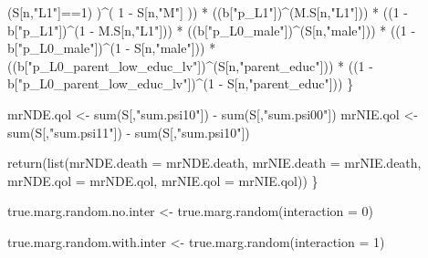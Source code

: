 \documentclass[
]{book}
\newenvironment{Shaded}{\begin{snugshade}}{\end{snugshade}}
\newcommand{\AttributeTok}[1]{\textcolor[rgb]{0.77,0.63,0.00}{#1}}
\newcommand{\DecValTok}[1]{\textcolor[rgb]{0.00,0.00,0.81}{#1}}
\newcommand{\FunctionTok}[1]{\textcolor[rgb]{0.00,0.00,0.00}{#1}}
\newcommand{\NormalTok}[1]{#1}
\newcommand{\OtherTok}[1]{\textcolor[rgb]{0.56,0.35,0.01}{#1}}
\newcommand{\SpecialCharTok}[1]{\textcolor[rgb]{0.00,0.00,0.00}{#1}}
\newcommand{\StringTok}[1]{\textcolor[rgb]{0.31,0.60,0.02}{#1}}
\begin{document}
\begin{Shaded}
\begin{Highlighting}[]
\NormalTok{          (S[n,}\StringTok{"L1"}\NormalTok{]}\SpecialCharTok{==}\DecValTok{1}\NormalTok{) )}\SpecialCharTok{\^{}}\NormalTok{( }\DecValTok{1} \SpecialCharTok{{-}}\NormalTok{ S[n,}\StringTok{"M"}\NormalTok{] )) }\SpecialCharTok{*}
\NormalTok{      ((b[}\StringTok{"p\_L1"}\NormalTok{])}\SpecialCharTok{\^{}}\NormalTok{(M.S[n,}\StringTok{"L1"}\NormalTok{])) }\SpecialCharTok{*}
\NormalTok{      ((}\DecValTok{1} \SpecialCharTok{{-}}\NormalTok{ b[}\StringTok{"p\_L1"}\NormalTok{])}\SpecialCharTok{\^{}}\NormalTok{(}\DecValTok{1} \SpecialCharTok{{-}}\NormalTok{ M.S[n,}\StringTok{"L1"}\NormalTok{])) }\SpecialCharTok{*}
\NormalTok{      ((b[}\StringTok{"p\_L0\_male"}\NormalTok{])}\SpecialCharTok{\^{}}\NormalTok{(S[n,}\StringTok{"male"}\NormalTok{])) }\SpecialCharTok{*} 
\NormalTok{      ((}\DecValTok{1} \SpecialCharTok{{-}}\NormalTok{ b[}\StringTok{"p\_L0\_male"}\NormalTok{])}\SpecialCharTok{\^{}}\NormalTok{(}\DecValTok{1} \SpecialCharTok{{-}}\NormalTok{ S[n,}\StringTok{"male"}\NormalTok{])) }\SpecialCharTok{*} 
\NormalTok{      ((b[}\StringTok{"p\_L0\_parent\_low\_educ\_lv"}\NormalTok{])}\SpecialCharTok{\^{}}\NormalTok{(S[n,}\StringTok{"parent\_educ"}\NormalTok{])) }\SpecialCharTok{*}
\NormalTok{      ((}\DecValTok{1} \SpecialCharTok{{-}}\NormalTok{ b[}\StringTok{"p\_L0\_parent\_low\_educ\_lv"}\NormalTok{])}\SpecialCharTok{\^{}}\NormalTok{(}\DecValTok{1} \SpecialCharTok{{-}}\NormalTok{ S[n,}\StringTok{"parent\_educ"}\NormalTok{])) }
\NormalTok{    \}}
  
\NormalTok{  mrNDE.qol }\OtherTok{\textless{}{-}} \FunctionTok{sum}\NormalTok{(S[,}\StringTok{"sum.psi10"}\NormalTok{]) }\SpecialCharTok{{-}} \FunctionTok{sum}\NormalTok{(S[,}\StringTok{"sum.psi00"}\NormalTok{])}
\NormalTok{  mrNIE.qol }\OtherTok{\textless{}{-}} \FunctionTok{sum}\NormalTok{(S[,}\StringTok{"sum.psi11"}\NormalTok{]) }\SpecialCharTok{{-}} \FunctionTok{sum}\NormalTok{(S[,}\StringTok{"sum.psi10"}\NormalTok{])}
  
  \FunctionTok{return}\NormalTok{(}\FunctionTok{list}\NormalTok{(}\AttributeTok{mrNDE.death =}\NormalTok{ mrNDE.death, }\AttributeTok{mrNIE.death =}\NormalTok{ mrNIE.death, }
              \AttributeTok{mrNDE.qol =}\NormalTok{ mrNDE.qol, }\AttributeTok{mrNIE.qol =}\NormalTok{ mrNIE.qol))}
\NormalTok{\}}
\end{Highlighting}
\end{Shaded}

\begin{Shaded}
\begin{Highlighting}[]
\NormalTok{true.marg.random.no.inter }\OtherTok{\textless{}{-}} \FunctionTok{true.marg.random}\NormalTok{(}\AttributeTok{interaction =} \DecValTok{0}\NormalTok{)}

\NormalTok{true.marg.random.with.inter }\OtherTok{\textless{}{-}} \FunctionTok{true.marg.random}\NormalTok{(}\AttributeTok{interaction =} \DecValTok{1}\NormalTok{)}
\end{Highlighting}
\end{Shaded}
\end{document}
